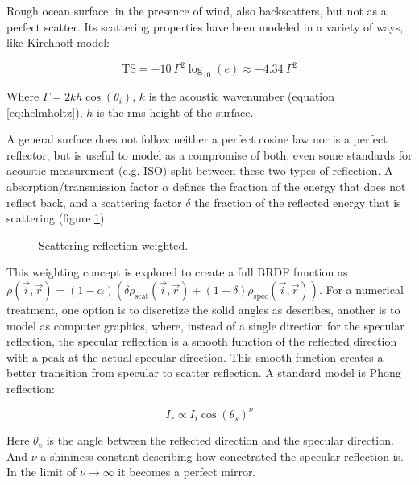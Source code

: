 Rough ocean surface, in the presence of wind, also backscatters, but not as a
perfect scatter. Its scattering properties have been modeled in a variety of
ways\cite{jones2009modelling}, like Kirchhoff model\cite{dunn2015springer}:

\begin{equation*}
\text{TS} = -10~\Gamma^2\log_{10}(e) \approx -4.34~\Gamma^2
\end{equation*}

Where $\Gamma = 2kh\cos(\theta_i)$, $k$ is the acoustic wavenumber (equation
\ref{eq:helmholtz}), $h$ is the rms height of the surface.

A general surface does not follow neither a perfect cosine law nor is a perfect
reflector, but is useful to model as a compromise of
both\cite{cox2006tutorial,vorlander2000definition}, even some standards for
acoustic measurement (e.g. ISO) split between these two types of
reflection\cite{rindel2001scattering}. A absorption/transmission factor $\alpha$
defines the fraction of the energy that does not reflect back, and a scattering
factor $\delta$ the fraction of the reflected energy that is scattering (figure
\ref{fig:scatter}).

\begin{figure}[h]
	\centering
	
	\caption{Scattering reflection weighted.}
	\label{fig:scatter}
\end{figure}

This weighting concept is explored to create a full BRDF function as
$\rho(\vec{i},\vec{r}) = (1-\alpha)(\delta \rho_\text{scat}(\vec{i},\vec{r}) +
(1-\delta) \rho_\text{spec}(\vec{i},\vec{r}) )$. For a numerical treatment, one
option is to discretize the solid angles as \citet{siltanen2007room} describes,
another is to model as computer graphics, where, instead of a single direction
for the specular reflection, the specular reflection is a smooth function of the
reflected direction with a peak at the actual specular direction. This smooth
function creates a better transition from specular to scatter reflection. A
standard model is Phong reflection\cite{phong1975illumination}:

\begin{equation}
\label{eq:phong}
I_r \propto	 I_i \cos(\theta_s)^\nu
\end{equation} 

Here $\theta_s$ is the angle between the reflected direction and the specular
direction. And $\nu$ a shininess constant describing how concetrated the
specular reflection is. In the limit of $\nu \to \infty$ it becomes a perfect mirror.


